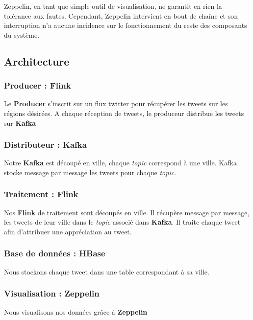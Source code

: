 \documentclass[a4paper,oneside,10pt]{article}
\begin{document}
Zeppelin, en tant que simple outil de visualisation, ne garantit en rien la tolérance aux fautes. Cependant, Zeppelin intervient en bout de chaîne et son interruption n'a aucune incidence sur le fonctionnement du reste des composants du système. 


\subsection{Architecture}

\subsubsection{Producer : Flink}

Le \textbf{Producer} s'inscrit sur un flux twitter pour récupérer les tweets sur les régions désirées. A chaque réception de tweets, le produceur distribue les tweets sur \textbf{Kafka}

\subsubsection{Distributeur : Kafka}

Notre \textbf{Kafka} est découpé en ville, chaque \textit{topic} correspond à une ville. Kafka stocke message par message les tweets pour chaque \textit{topic}. 

\subsubsection{Traitement : Flink}

Nos \textbf{Flink} de traitement sont découpés en ville. Il récupère message par message, les tweets de leur ville dans le \textit{topic} associé dans \textbf{Kafka}. Il traite chaque tweet afin d'attribuer une appréciation au tweet. 

\subsubsection{Base de données : HBase}

Nous stockons chaque tweet dans une table correspondant à sa ville. 

\subsubsection{Visualisation : Zeppelin}

Nous visualisons nos données grâce à \textbf{Zeppelin}
\end{document}

